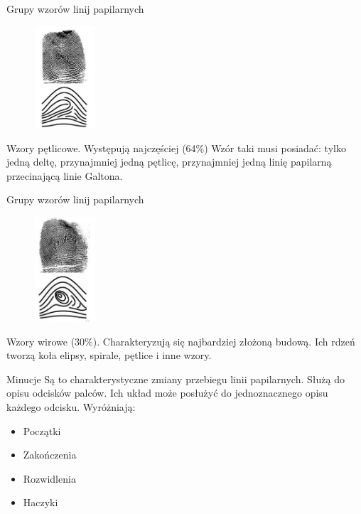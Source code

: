 \documentclass{beamer}
\begin{document}
\begin{frame}{Grupy wzorów linij papilarnych}
    \begin{figure}[t]
        \centering
        \includegraphics[width=0.2\textwidth]{fingerprints/petlicowy.jpg}
    \end{figure}
    Wzory pętlicowe.
    Występują najczęściej (64\%) Wzór taki musi posiadać: tylko jedną deltę, przynajmniej jedną pętlicę, przynajmniej jedną linię papilarną przecinającą linie Galtona.
\end{frame}

\begin{frame}{Grupy wzorów linij papilarnych}
    \begin{figure}[t]
        \centering
        \includegraphics[width=0.2\textwidth]{fingerprints/wirowy.jpg}
    \end{figure}
    Wzory wirowe (30\%). Charakteryzują się najbardziej złożoną budową. Ich rdzeń tworzą koła elipsy, spirale, pętlice i inne wzory.
\end{frame}

\begin{frame}{Minucje}
    Są to charakterystyczne zmiany przebiegu linii papilarnych. Służą do opisu odcisków palców. Ich układ może posłużyć do jednoznacznego opisu każdego odcisku.
    Wyróżniają:
    \begin{itemize}
        \item{Początki}
        \item{Zakończenia}
        \item{Rozwidlenia}
        \item{Haczyki}
    \end{itemize}
\end{frame}
\end{document}

